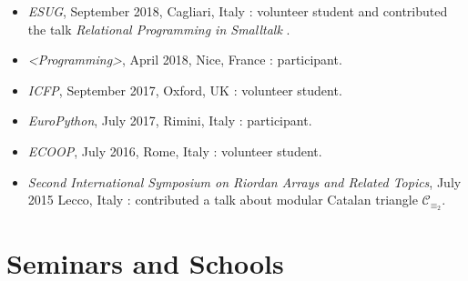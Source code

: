 \documentclass[a4paper]{tufte-handout}
\begin{document}
    \begin{itemize}
        \item \emph{ESUG}, September 2018, Cagliari, Italy : volunteer student and
        contributed the talk \textit{Relational Programming in Smalltalk} .
        \item \emph{<Programming>}, April 2018, Nice, France : participant.
        \item \emph{ICFP}, September 2017, Oxford, UK : volunteer student.
        \item \emph{EuroPython}, July 2017, Rimini, Italy : participant.
        \item \emph{ECOOP}, July 2016, Rome, Italy : volunteer student.
        \item \emph{Second International Symposium on Riordan Arrays and Related Topics}, 
            July 2015 Lecco, Italy : contributed a talk about modular Catalan triangle $\mathcal{C}_{\equiv_{2}}$.
    \end{itemize}

    \section{Seminars and Schools}
\end{document}
